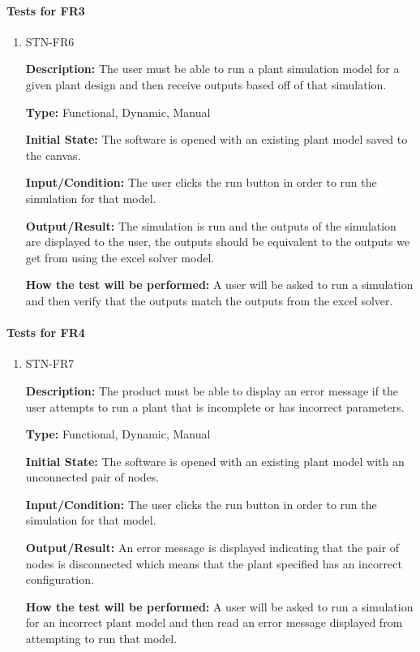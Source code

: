 \documentclass[12pt, titlepage]{article}
\begin{document}
\paragraph{Tests for FR3}

\begin{enumerate}

\item{STN-FR6\\}

\textbf{Description:} The user must be able to run a plant simulation model for a given plant design and then receive outputs based off of that simulation. 

\textbf{Type:} Functional, Dynamic, Manual

\textbf{Initial State:} The software is opened with an existing plant model saved to the canvas.

\textbf{Input/Condition:} The user clicks the run button in order to run the simulation for that model.

\textbf{Output/Result:} The simulation is run and the outputs of the simulation are displayed to the user, the outputs should be equivalent to the outputs we get from using the excel solver model.

\textbf{How the test will be performed:} A user will be asked to run a simulation and then verify that the outputs match the outputs from the excel solver. 

\end{enumerate}
			
\paragraph{Tests for FR4}


\begin{enumerate}

\item{STN-FR7\\}

\textbf{Description:} The product must be able to display an error message if the user attempts to run a plant that is incomplete or has incorrect parameters. 

\textbf{Type:} Functional, Dynamic, Manual

\textbf{Initial State:} The software is opened with an existing plant model with an unconnected pair of nodes.

\textbf{Input/Condition:} The user clicks the run button in order to run the simulation for that model.

\textbf{Output/Result:} An error message is displayed indicating that the pair of nodes is disconnected which means that the plant specified has an incorrect configuration. 

\textbf{How the test will be performed:} A user will be asked to run a simulation for an incorrect plant model and then read an error message displayed from attempting to run that model. 

\end{enumerate}
\end{document}
